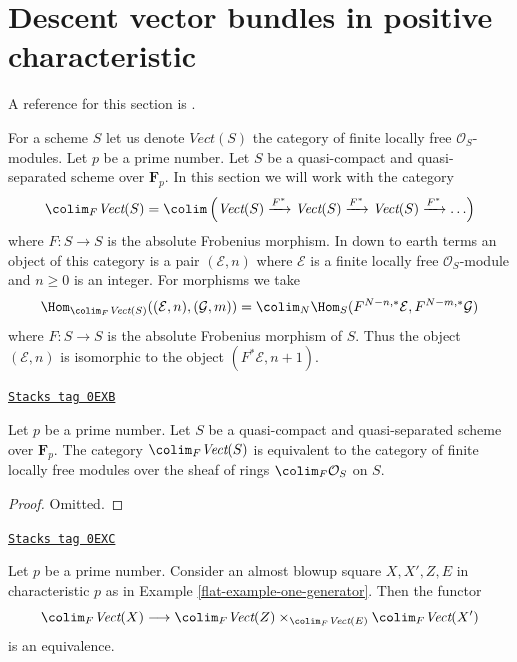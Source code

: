 \section{Descent vector bundles in positive characteristic}
\label{flat-section-descent-vectorbundles-h}
A reference for this section is \cite{Witt-Grass}.

\medskip\noindent
For a scheme $S$ let us denote $\textit{Vect}(S)$ the category
of finite locally free $\mathcal{O}_S$-modules.
Let $p$ be a prime number. Let $S$ be a quasi-compact and quasi-separated
scheme over $\mathbf{F}_p$. In this section we will work with the
category
$$
\colim_F \textit{Vect}(S) =
\colim
\left(
\textit{Vect}(S) \xrightarrow{F^*}
\textit{Vect}(S) \xrightarrow{F^*}
\textit{Vect}(S) \xrightarrow{F^*} \ldots
\right)
$$
where $F : S \to S$ is the absolute Frobenius morphism. In down
to earth terms an object of this category is a pair $(\mathcal{E}, n)$
where $\mathcal{E}$ is a finite locally free $\mathcal{O}_S$-module
and $n \geq 0$ is an integer. For morphisms we take
$$
\Hom_{\colim_F \textit{Vect}(S)}((\mathcal{E}, n), (\mathcal{G}, m)) =
\colim_N \Hom_S(F^{N - n, *}\mathcal{E}, F^{N - m, *}\mathcal{G})
$$
where $F : S \to S$ is the absolute Frobenius morphism of $S$.
Thus the object $(\mathcal{E}, n)$ is isomorphic to the object
$(F^*\mathcal{E}, n + 1)$.

\begin{lemma}
\label{flat-lemma-colim-F-Vect}
\href{https://stacks.math.columbia.edu/tag/0EXB}{\texttt{Stacks tag 0EXB}}

Let $p$ be a prime number. Let $S$ be a quasi-compact and quasi-separated
scheme over $\mathbf{F}_p$. The category $\colim_F \textit{Vect}(S)$
is equivalent to the category of finite locally free modules
over the sheaf of rings $\colim_F \mathcal{O}_S$ on $S$.
\end{lemma}

\begin{proof}
Omitted.
\end{proof}

\begin{lemma}
\label{flat-lemma-vector-bundle-I}
\href{https://stacks.math.columbia.edu/tag/0EXC}{\texttt{Stacks tag 0EXC}}

Let $p$ be a prime number. Consider an almost blowup square $X, X', Z, E$
in characteristic $p$ as in Example \ref{flat-example-one-generator}.
Then the functor
$$
\colim_F \textit{Vect}(X)
\longrightarrow
\colim_F \textit{Vect}(Z)
\times_{\colim_F \textit{Vect}(E)}
\colim_F \textit{Vect}(X')
$$
is an equivalence.
\end{lemma}

